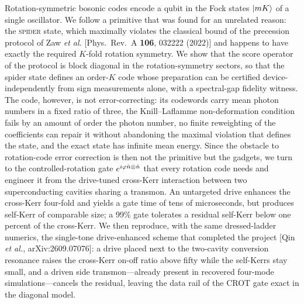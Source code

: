 Rotation-symmetric bosonic codes encode a qubit in the Fock states $|mK\rangle$ of a single oscillator. We follow a primitive that was found for an unrelated reason: the \textsc{spider} state, which maximally violates the classical bound of the precession protocol of Zaw \emph{et al.} [Phys.\ Rev.\ A \textbf{106}, 032222 (2022)] and happens to have exactly the required $K$-fold rotation symmetry. We show that the score operator of the protocol is block diagonal in the rotation-symmetry sectors, so that the spider state defines an order-$K$ code whose preparation can be certified device-independently from sign measurements alone, with a spectral-gap fidelity witness. The code, however, is not error-correcting: its codewords carry mean photon numbers in a fixed ratio of three, the Knill--Laflamme non-deformation condition fails by an amount of order the photon number, no finite reweighting of the coefficients can repair it without abandoning the maximal violation that defines the state, and the exact state has infinite mean energy. Since the obstacle to rotation-code error correction is then not the primitive but the gadgets, we turn to the controlled-rotation gate $e^{i\varphi\hat n\otimes\hat n}$ that every rotation code needs and engineer it from the drive-tuned cross-Kerr interaction between two superconducting cavities sharing a transmon. An untargeted drive enhances the cross-Kerr four-fold and yields a gate time of tens of microseconds, but produces self-Kerr of comparable size; a 99\% gate tolerates a residual self-Kerr below one percent of the cross-Kerr. We then reproduce, with the same dressed-ladder numerics, the single-tone drive-enhanced scheme that completed the project [Qin \emph{et al.}, arXiv:2609.07076]: a drive placed next to the two-cavity conversion resonance raises the cross-Kerr on-off ratio above fifty while the self-Kerrs stay small, and a driven side transmon---already present in recovered four-mode simulations---cancels the residual, leaving the data rail of the CROT gate exact in the diagonal model.
